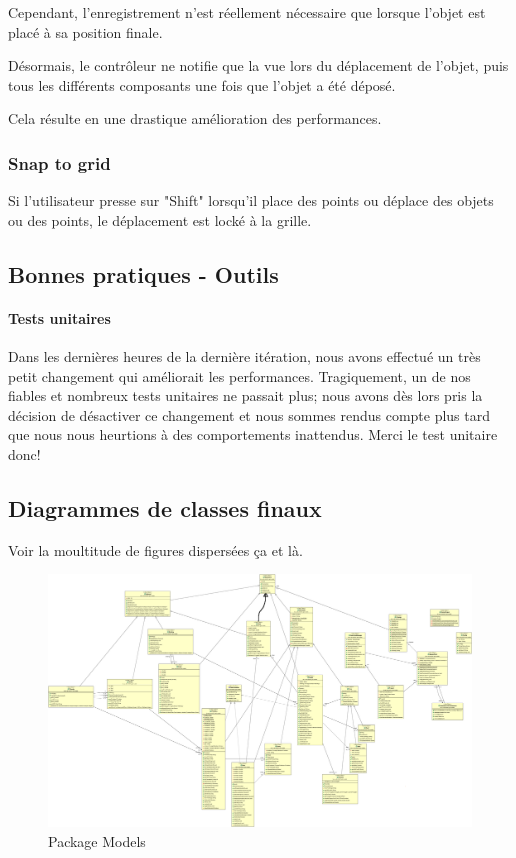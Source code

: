 	Cependant, l'enregistrement n'est réellement nécessaire que lorsque l'objet
	est placé à sa position finale.

	Désormais, le contrôleur ne notifie que la vue lors du déplacement de l'objet,
	puis tous les différents composants une fois que l'objet a été déposé.

	Cela résulte en une drastique amélioration des performances.

	\subsubsection{Snap to grid}
	Si l'utilisateur presse sur "Shift" lorsqu'il place des points ou déplace
	des objets ou des points, le déplacement est locké à la grille.

\subsection{Bonnes pratiques - Outils}

	\paragraph{Tests unitaires}
	Dans les dernières heures de la dernière itération, nous avons effectué un 
	très petit changement qui améliorait les performances. Tragiquement, un de nos
	fiables et nombreux tests unitaires ne passait plus; nous avons dès lors 
	pris la décision de désactiver ce changement et nous sommes rendus compte plus
	tard que nous nous heurtions à des comportements inattendus. Merci le test 
	unitaire donc!

\subsection{Diagrammes de classes finaux}
	
	Voir la moultitude de figures dispersées ça et là.

	\begin{figure}
		\center
		\includegraphics[width=\textwidth]{iteration4/fig/models-final-hand.png}
		\caption{Package Models}
	\end{figure}

